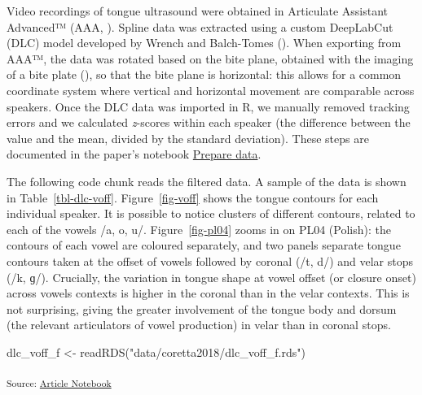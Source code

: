\documentclass[
  man,
  longtable,
  nolmodern,
  notxfonts,
  notimes,
  colorlinks=true,linkcolor=blue,citecolor=blue,urlcolor=blue]{apa7}
\newenvironment{Shaded}{\begin{snugshade}}{\end{snugshade}}
\newcommand{\FunctionTok}[1]{\textcolor[rgb]{0.28,0.35,0.67}{#1}}
\newcommand{\NormalTok}[1]{\textcolor[rgb]{0.00,0.23,0.31}{#1}}
\newcommand{\OtherTok}[1]{\textcolor[rgb]{0.00,0.23,0.31}{#1}}
\newcommand{\StringTok}[1]{\textcolor[rgb]{0.13,0.47,0.30}{#1}}
\begin{document}
Video recordings of tongue ultrasound were obtained in Articulate
Assistant Advanced™ (AAA, ). Spline data was extracted using a custom DeepLabCut (DLC)
model developed by Wrench and Balch-Tomes
(). When exporting from AAA™, the data
was rotated based on the bite plane, obtained with the imaging of a bite
plate (), so that the
bite plane is horizontal: this allows for a common coordinate system
where vertical and horizontal movement are comparable across speakers.
Once the DLC data was imported in R, we manually removed tracking errors
and we calculated \emph{z}-scores within each speaker (the difference
between the value and the mean, divided by the standard deviation).
These steps are documented in the paper's notebook
\href{notebooks/01_prepare_data.qmd}{Prepare data}.

The following code chunk reads the filtered data. A sample of the data
is shown in Table~\ref{tbl-dlc-voff}. Figure~\ref{fig-voff} shows the
tongue contours for each individual speaker. It is possible to notice
clusters of different contours, related to each of the vowels /a, o, u/.
Figure~\ref{fig-pl04} zooms in on PL04 (Polish): the contours of each
vowel are coloured separately, and two panels separate tongue contours
taken at the offset of vowels followed by coronal (/t, d/) and velar
stops (/k, ɡ/). Crucially, the variation in tongue shape at vowel offset
(or closure onset) across vowels contexts is higher in the coronal than
in the velar contexts. This is not surprising, giving the greater
involvement of the tongue body and dorsum (the relevant articulators of
vowel production) in velar than in coronal stops.

\begin{Shaded}
\begin{Highlighting}[]
\NormalTok{dlc\_voff\_f }\OtherTok{\textless{}{-}} \FunctionTok{readRDS}\NormalTok{(}\StringTok{"data/coretta2018/dlc\_voff\_f.rds"}\NormalTok{)}
\end{Highlighting}
\end{Shaded}

\textsubscript{Source:
\href{https://stefanocoretta.github.io/mv_uti/index.qmd.html}{Article
Notebook}}
\end{document}
